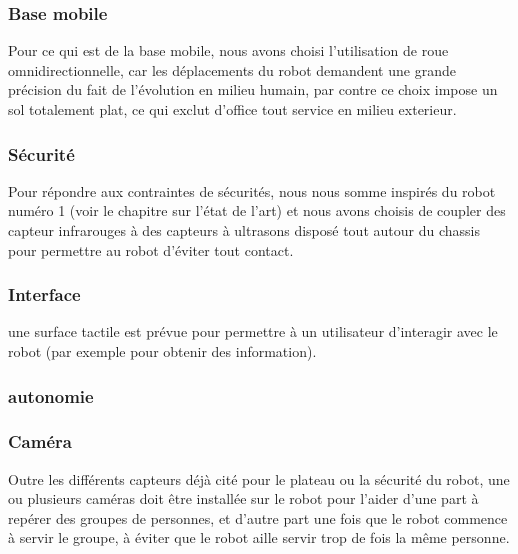 \subsubsection{Base mobile}
Pour ce qui est de la base mobile, nous avons choisi l'utilisation de
roue omnidirectionnelle, car les déplacements du robot demandent une
grande précision du fait de l'évolution en milieu humain, par contre
ce choix impose un sol totalement plat, ce qui exclut d'office tout
service en milieu exterieur.

\subsubsection{Sécurité}
Pour répondre aux contraintes de sécurités, nous nous somme inspirés
du robot numéro 1 (voir le chapitre sur l'état de l'art) et nous avons
choisis de coupler des capteur infrarouges à des capteurs à ultrasons
disposé tout autour du chassis pour permettre au robot d'éviter tout
contact. 

\subsubsection{Interface}
une surface tactile est prévue pour permettre à un utilisateur
d'interagir avec le robot (par exemple pour obtenir des information).

\subsubsection{autonomie}

\subsubsection{Caméra}

Outre les différents capteurs déjà cité pour le plateau ou la sécurité
du robot, une ou plusieurs caméras doit être installée sur le robot pour l'aider
d'une part à repérer des groupes de personnes, et d'autre part une
fois que le robot commence à servir le groupe, à éviter que le robot
aille servir trop de fois la même personne.

\subsubsection{}
